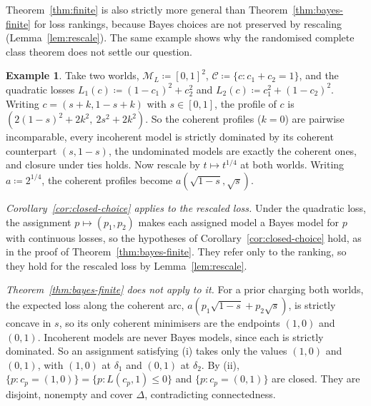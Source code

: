 \documentclass[11pt]{article}
\theoremstyle{definition}
\newtheorem{example}[theorem]{Example}
\theoremstyle{remark}
\newcommand{\M}{\mathcal M}
\newcommand{\C}{\mathcal C}
\begin{document}
Theorem~\ref{thm:finite} is also strictly more general than Theorem~\ref{thm:bayes-finite} for loss rankings, because Bayes choices are not preserved by rescaling (Lemma~\ref{lem:rescale}). The same example shows why the randomised complete class theorem does not settle our question.

\begin{example}\label{ex:rescale}
Take two worlds, $\M_L\coloneqq[0,1]^2$, $\C\coloneqq\{c:c_1+c_2=1\}$, and the quadratic losses $L_1(c)\coloneqq(1-c_1)^2+c_2^2$ and $L_2(c)\coloneqq c_1^2+(1-c_2)^2$. Writing $c=(s+k,1-s+k)$ with $s\in[0,1]$, the profile of $c$ is $(2(1-s)^2+2k^2,\ 2s^2+2k^2)$. So the coherent profiles ($k=0$) are pairwise incomparable, every incoherent model is strictly dominated by its coherent counterpart $(s,1-s)$, the undominated models are exactly the coherent ones, and closure under ties holds. Now rescale by $t\mapsto t^{1/4}$ at both worlds. Writing $a\coloneqq2^{1/4}$, the coherent profiles become $a(\sqrt{1-s},\sqrt s)$.

\emph{Corollary~\ref{cor:closed-choice} applies to the rescaled loss.} Under the quadratic loss, the assignment $p\mapsto(p_1,p_2)$ makes each assigned model a Bayes model for $p$ with continuous losses, so the hypotheses of Corollary~\ref{cor:closed-choice} hold, as in the proof of Theorem~\ref{thm:bayes-finite}. They refer only to the ranking, so they hold for the rescaled loss by Lemma~\ref{lem:rescale}.

\emph{Theorem~\ref{thm:bayes-finite} does not apply to it.} For a prior charging both worlds, the expected loss along the coherent arc, $a(p_1\sqrt{1-s}+p_2\sqrt s)$, is strictly concave in $s$, so its only coherent minimisers are the endpoints $(1,0)$ and $(0,1)$. Incoherent models are never Bayes models, since each is strictly dominated. So an assignment satisfying (i) takes only the values $(1,0)$ and $(0,1)$, with $(1,0)$ at $\delta_1$ and $(0,1)$ at $\delta_2$. By (ii), $\{p:c_p=(1,0)\}=\{p:L(c_p,1)\le0\}$ and $\{p:c_p=(0,1)\}$ are closed. They are disjoint, nonempty and cover $\Delta$, contradicting connectedness.


\end{example}
\end{document}
